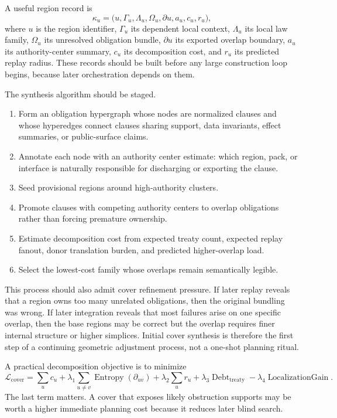 \documentclass[11pt]{report}
\begin{document}
A useful region record is
\[
\kappa_u
=
\bigl(
u,
\Gamma_u,
\Lambda_u,
\Omega_u,
\partial u,
a_u,
c_u,
r_u
\bigr),
\]
where $u$ is the region identifier, $\Gamma_u$ its dependent local context, $\Lambda_u$ its local law family, $\Omega_u$ its unresolved obligation bundle, $\partial u$ its exported overlap boundary, $a_u$ its authority-center summary, $c_u$ its decomposition cost, and $r_u$ its predicted replay radius. These records should be built before any large construction loop begins, because later orchestration depends on them.

The synthesis algorithm should be staged.
\begin{enumerate}
\item Form an obligation hypergraph whose nodes are normalized clauses and whose hyperedges connect clauses sharing support, data invariants, effect summaries, or public-surface claims.
\item Annotate each node with an authority center estimate: which region, pack, or interface is naturally responsible for discharging or exporting the clause.
\item Seed provisional regions around high-authority clusters.
\item Promote clauses with competing authority centers to overlap obligations rather than forcing premature ownership.
\item Estimate decomposition cost from expected treaty count, expected replay fanout, donor translation burden, and predicted higher-overlap load.
\item Select the lowest-cost family whose overlaps remain semantically legible.
\end{enumerate}

This process should also admit cover refinement pressure. If later replay reveals that a region owns too many unrelated obligations, then the original bundling was wrong. If later integration reveals that most failures arise on one specific overlap, then the base regions may be correct but the overlap requires finer internal structure or higher simplices. Initial cover synthesis is therefore the first step of a continuing geometric adjustment process, not a one-shot planning ritual.

A practical decomposition objective is to minimize
\[
\mathcal{L}_{\mathrm{cover}}
=
\sum_u c_u
+
\lambda_1 \sum_{u \neq v} \operatorname{Entropy}(\partial_{uv})
+
\lambda_2 \sum_u r_u
+
\lambda_3 \operatorname{Debt}_{\mathrm{treaty}}
-
\lambda_4 \operatorname{LocalizationGain}.
\]
The last term matters. A cover that exposes likely obstruction supports may be worth a higher immediate planning cost because it reduces later blind search.
\end{document}
